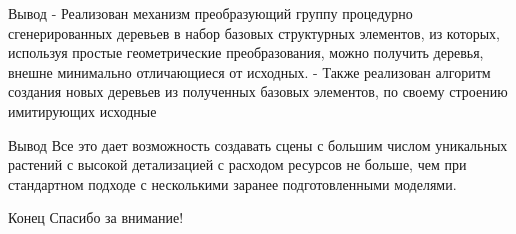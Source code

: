 \documentclass[14pt]{beamer}
\begin{document}
\begin{frame}{Вывод}
 - Реализован механизм преобразующий группу процедурно сгенерированных деревьев в набор базовых структурных элементов, из которых, используя простые геометрические преобразования, можно получить деревья, внешне минимально отличающиеся от исходных. \linebreak	
 - Также реализован алгоритм создания новых деревьев из полученных базовых элементов, по своему строению имитирующих исходные\linebreak
\end{frame}
\begin{frame}{Вывод}	
Все это дает возможность создавать сцены с большим числом уникальных растений с высокой детализацией с расходом ресурсов не больше, чем при стандартном подходе с несколькими заранее подготовленными моделями.
\end{frame}
\begin{frame}{Конец}
Спасибо за внимание!
\end{frame}
\end{document}
